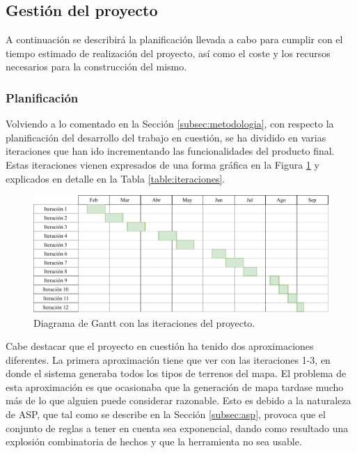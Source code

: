 \subsection{Gestión del proyecto}
\label{subsec:gestion}

A continuación se describirá la planificación llevada a cabo para cumplir con el tiempo estimado de realización del proyecto, así como el coste y los recursos necesarios para la construcción del mismo.

\subsubsection{Planificación}

Volviendo a lo comentado en la Sección \ref{subsec:metodologia}, con respecto la planificación del desarrollo del trabajo en cuestión, se ha dividido en varias iteraciones que han ido incrementando las funcionalidades del producto final. Estas iteraciones vienen expresados de una forma gráfica en la Figura \ref{fig:gantt} y explicados en detalle en la Tabla \ref{table:iteraciones}.

\begin{figure}[!h]
	\centering
	\includegraphics[width=\textwidth]{images/gantt.pdf}
	\caption{Diagrama de Gantt con las iteraciones del proyecto.}
	\label{fig:gantt}
\end{figure}

Cabe destacar que el proyecto en cuestión ha tenido dos aproximaciones diferentes. La primera aproximación tiene que ver con las iteraciones 1-3, en donde el sistema generaba todos los tipos de terrenos del mapa. El problema de esta aproximación es que ocasionaba que la generación de mapa tardase mucho más de lo que alguien puede considerar razonable. Esto es debido a la naturaleza de ASP, que tal como se describe en la Sección \ref{subsec:asp}, provoca que el conjunto de reglas a tener en cuenta sea exponencial, dando como resultado una explosión combinatoria de hechos y que la herramienta no sea usable. \\


